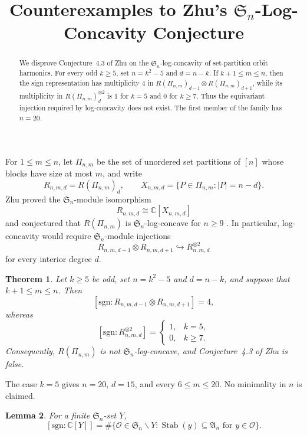 \documentclass[11pt]{amsart}
\title[Counterexamples to Zhu's log-concavity conjecture]
{Counterexamples to Zhu's
\texorpdfstring{$\mathfrak S_n$}{Sn}-Log-Concavity Conjecture}
\date{}
\newtheorem{theorem}{Theorem}
\newtheorem{lemma}[theorem]{Lemma}
\newcommand{\C}{\mathbb C}
\newcommand{\signrep}{\mathrm{sgn}}
\newcommand{\smult}[1]{[\signrep:#1]}
\DeclareMathOperator{\Stab}{Stab}
\begin{document}
\begin{abstract}
We disprove Conjecture~4.3 of Zhu on the
$\mathfrak S_n$-log-concavity of set-partition orbit harmonics.
For every odd $k\ge5$, set $n=k^2-5$ and $d=n-k$. If
$k+1\le m\le n$, then the sign representation has multiplicity $4$ in
$R(\Pi_{n,m})_{d-1}\otimes R(\Pi_{n,m})_{d+1}$, while its multiplicity
in $R(\Pi_{n,m})_d^{\otimes2}$ is $1$ for $k=5$ and $0$ for $k\ge7$.
Thus the equivariant injection required by log-concavity does not exist.
The first member of the family has $n=20$.
\end{abstract}

\maketitle

For $1\le m\le n$, let $\Pi_{n,m}$ be the set of unordered set
partitions of $[n]$ whose blocks have size at most $m$, and write
\[
  R_{n,m,d}=R(\Pi_{n,m})_d,
  \qquad
  X_{n,m,d}=\{P\in\Pi_{n,m}: |P|=n-d\}.
\]
Zhu proved the $\mathfrak S_n$-module isomorphism
\begin{equation}\label{eq:permutation-model}
  R_{n,m,d}\cong \C[X_{n,m,d}]
\end{equation}
and conjectured that $R(\Pi_{n,m})$ is $\mathfrak S_n$-log-concave for
$n\ge9$ \cite[Proposition~3.29 and Conjecture~4.3]{Zhu}. In particular,
log-concavity would require $\mathfrak S_n$-module injections
\[
  R_{n,m,d-1}\otimes R_{n,m,d+1}
  \hookrightarrow R_{n,m,d}^{\otimes2}
\]
for every interior degree $d$.

\begin{theorem}\label{thm:main}
Let $k\ge5$ be odd, set $n=k^2-5$ and $d=n-k$, and suppose that
$k+1\le m\le n$. Then
\[
  \smult{R_{n,m,d-1}\otimes R_{n,m,d+1}}=4,
\]
whereas
\[
  \smult{R_{n,m,d}^{\otimes2}}
  =
  \begin{cases}
    1,&k=5,\\
    0,&k\ge7.
  \end{cases}
\]
Consequently, $R(\Pi_{n,m})$ is not $\mathfrak S_n$-log-concave, and
Conjecture~4.3 of Zhu is false.
\end{theorem}

The case $k=5$ gives $n=20$, $d=15$, and every $6\le m\le20$.
No minimality in $n$ is claimed.

\begin{lemma}\label{lem:orbit-sign}
For a finite $\mathfrak S_n$-set $Y$,
\[
  \smult{\C[Y]}
  =\#\{\mathcal O\in\mathfrak S_n\backslash Y:
  \Stab(y)\subseteq\mathfrak A_n\text{ for }y\in\mathcal O\}.
\]
\end{lemma}
\end{document}
